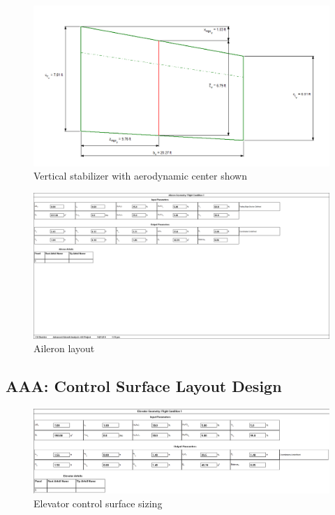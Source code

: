 \documentclass[conf]{new-aiaa}
\begin{document}
\begin{figure}[H]
    \includegraphics[width=\textwidth]{Report3Printouts/Empannage/Vertical_volumeratio_plot.png}
    \caption{Vertical stabilizer with aerodynamic center shown}
    \label{fig:vertical_volumeratio_plot}
\end{figure}

\begin{figure}[H]
    \includegraphics[width=\textwidth]{Report3Printouts/Wing_and_Aileron/aileron_sizing.png}
    \caption{Aileron layout}
    \label{fig:aileron_sizing}
\end{figure}

\subsection{AAA: Control Surface Layout Design}
\begin{figure}[H]
    \includegraphics[width=\textwidth]{Report3Printouts/Empannage/Horizontal_elevator_cropped.png}
    \caption{Elevator control surface sizing}
    \label{fig:horizontal_elevator}
\end{figure}
\end{document}

